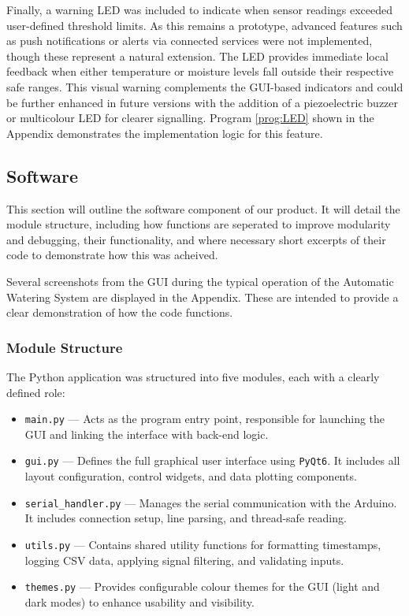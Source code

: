 \documentclass[a4paper,11pt]{article}
\begin{document}
Finally, a warning LED was included to indicate when sensor readings 
exceeded user-defined threshold limits. 
As this remains a prototype, advanced features such as push notifications 
or alerts via connected services were not implemented, 
though these represent a natural extension. 
The LED provides immediate local feedback when either temperature or moisture 
levels fall outside their respective safe ranges. 
This visual warning complements the GUI-based indicators and could be further enhanced 
in future versions with the addition of a piezoelectric buzzer 
or multicolour LED for clearer signalling. 
Program \ref{prog:LED} shown in the Appendix demonstrates 
the implementation logic for this feature.

\subsection{Software}
\label{sec:software}

This section will outline the software component of our product.
It will detail the module structure,
including how functions are seperated to improve modularity and debugging,
their functionality,
and where necessary short excerpts of their code to demonstrate how this was acheived.

Several screenshots from the GUI during the typical operation
of the Automatic Watering System are displayed in the Appendix.
These are intended to provide a clear demonstration of how the code functions.

\subsubsection{Module Structure}
\label{subsec:software_modules}

The Python application was structured into five modules, each with a clearly defined role:

\begin{itemize}
    \item \texttt{main.py} --- Acts as the program entry point, 
    responsible for launching the GUI and linking the interface with back-end logic.
    \item \texttt{gui.py} --- Defines the full graphical user interface using \texttt{PyQt6}. 
    It includes all layout configuration, control widgets, and data plotting components.
    \item \texttt{serial\_handler.py} --- Manages the serial communication with the Arduino. 
    It includes connection setup, line parsing, and thread-safe reading.
    \item \texttt{utils.py} --- Contains shared utility functions for formatting timestamps, 
    logging CSV data, applying signal filtering, and validating inputs.
    \item \texttt{themes.py} --- Provides configurable colour themes for the GUI 
    (light and dark modes) to enhance usability and visibility.
\end{itemize}
\end{document}
